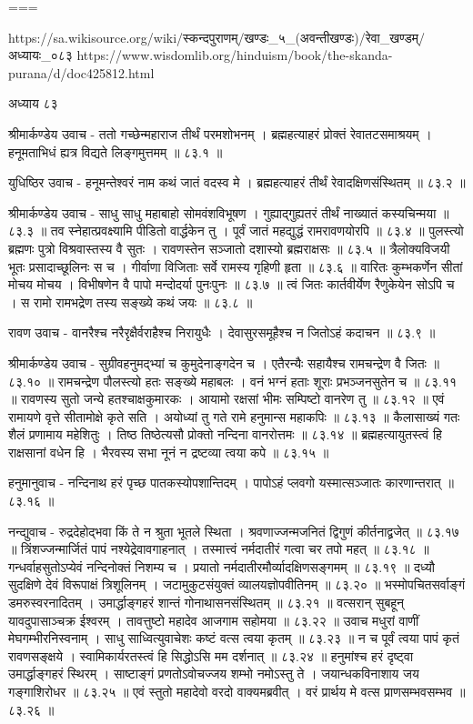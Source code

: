 ===

https://sa.wikisource.org/wiki/स्कन्दपुराणम्/खण्डः_५_(अवन्तीखण्डः)/रेवा_खण्डम्/अध्यायः_०८३
https://www.wisdomlib.org/hinduism/book/the-skanda-purana/d/doc425812.html

अध्याय ८३

श्रीमार्कण्डेय उवाच -
ततो गच्छेन्महाराज तीर्थं परमशोभनम् ।
ब्रह्महत्याहरं प्रोक्तं रेवातटसमाश्रयम् ।
हनूमताभिधं ह्यत्र विद्यते लिङ्गमुत्तमम् ॥ ८३.१ ॥

युधिष्ठिर उवाच -
हनूमन्तेश्वरं नाम कथं जातं वदस्व मे ।
ब्रह्महत्याहरं तीर्थं रेवादक्षिणसंस्थितम् ॥ ८३.२ ॥

श्रीमार्कण्डेय उवाच -
साधु साधु महाबाहो सोमवंशविभूषण ।
गुह्याद्गुह्यतरं तीर्थं नाख्यातं कस्यचिन्मया ॥ ८३.३ ॥
तव स्नेहात्प्रवक्ष्यामि पीडितो वार्द्धकेन तु ।
पूर्वं जातं महद्युद्धं रामरावणयोरपि ॥ ८३.४ ॥
पुलस्त्यो ब्रह्मणः पुत्रो विश्रवास्तस्य वै सुतः ।
रावणस्तेन सञ्जातो दशास्यो ब्रह्मराक्षसः ॥ ८३.५ ॥
त्रैलोक्यविजयी भूतः प्रसादाच्छूलिनः स च ।
गीर्वाणा विजिताः सर्वे रामस्य गृहिणी हृता ॥ ८३.६ ॥
वारितः कुम्भकर्णेन सीतां मोचय मोचय ।
विभीषणेन वै पापो मन्दोदर्या पुनःपुनः ॥ ८३.७ ॥
त्वं जितः कार्तवीर्येण रैणुकेयेन सोऽपि च ।
स रामो रामभद्रेण तस्य सङ्ख्ये कथं जयः ॥ ८३.८ ॥

रावण उवाच -
वानरैश्च नरैरृक्षैर्वराहैश्च निरायुधैः ।
देवासुरसमूहैश्च न जितोऽहं कदाचन ॥ ८३.९ ॥

श्रीमार्कण्डेय उवाच -
सुग्रीवहनुमद्भ्यां च कुमुदेनाङ्गदेन च ।
एतैरन्यैः सहायैश्च रामचन्द्रेण वै जितः ॥ ८३.१० ॥
रामचन्द्रेण पौलस्त्यो हतः सङ्ख्ये महाबलः ।
वनं भग्नं हताः शूराः प्रभञ्जनसुतेन च ॥ ८३.११ ॥
रावणस्य सुतो जन्ये हतश्चाक्षकुमारकः ।
आयामो रक्षसां भीमः सम्पिष्टो वानरेण तु ॥ ८३.१२ ॥
एवं रामायणे वृत्ते सीतामोक्षे कृते सति ।
अयोध्यां तु गते रामे हनुमान्स महाकपिः ॥ ८३.१३ ॥
कैलासाख्यं गतः शैलं प्रणामाय महेशितुः ।
तिष्ठ तिष्ठेत्यसौ प्रोक्तो नन्दिना वानरोत्तमः ॥ ८३.१४ ॥
ब्रह्महत्यायुतस्त्वं हि राक्षसानां वधेन हि ।
भैरवस्य सभा नूनं न द्रष्टव्या त्वया कपे ॥ ८३.१५ ॥

हनुमानुवाच -
नन्दिनाथ हरं पृच्छ पातकस्योपशान्तिदम् ।
पापोऽहं प्लवगो यस्मात्सञ्जातः कारणान्तरात् ॥ ८३.१६ ॥

नन्द्युवाच -
रुद्रदेहोद्भवा किं ते न श्रुता भूतले स्थिता ।
श्रवणाज्जन्मजनितं द्विगुणं कीर्तनाद्व्रजेत् ॥ ८३.१७ ॥
त्रिंशज्जन्मार्जितं पापं नश्येद्रेवावगाहनात् ।
तस्मात्त्वं नर्मदातीरं गत्वा चर तपो महत् ॥ ८३.१८ ॥
गन्धर्वाहसुतोऽप्येवं नन्दिनोक्तं निशम्य च ।
प्रयातो नर्मदातीरमौर्व्यादक्षिणसङ्गमम् ॥ ८३.१९ ॥
दध्यौ सुदक्षिणे देवं विरूपाक्षं त्रिशूलिनम् ।
जटामुकुटसंयुक्तं व्यालयज्ञोपवीतिनम् ॥ ८३.२० ॥
भस्मोपचितसर्वाङ्गं डमरुस्वरनादितम् ।
उमार्द्धाङ्गहरं शान्तं गोनाथासनसंस्थितम् ॥ ८३.२१ ॥
वत्सरान् सुबहून् यावदुपासाञ्चक्र ईश्वरम् ।
तावत्तुष्टो महादेव आजगाम सहोमया ॥ ८३.२२ ॥
उवाच मधुरां वाणीं मेघगम्भीरनिस्वनाम् ।
साधु साध्वित्युवाचेशः कष्टं वत्स त्वया कृतम् ॥ ८३.२३ ॥
न च पूर्वं त्वया पापं कृतं रावणसङ्क्षये ।
स्वामिकार्यरतस्त्वं हि सिद्धोऽसि मम दर्शनात् ॥ ८३.२४ ॥
हनुमांश्च हरं दृष्ट्वा उमार्द्धाङ्गहरं स्थिरम् ।
साष्टाङ्गं प्रणतोऽवोचज्जय शम्भो नमोऽस्तु ते ।
जयान्धकविनाशाय जय गङ्गाशिरोधर ॥ ८३.२५ ॥
एवं स्तुतो महादेवो वरदो वाक्यमब्रवीत् ।
वरं प्रार्थय मे वत्स प्राणसम्भवसम्भव ॥ ८३.२६ ॥

